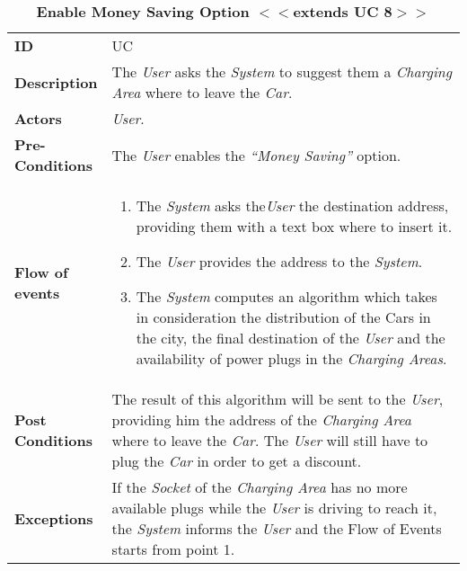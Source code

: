 \begin{longtable}{|p{0.2\linewidth} p{0.8\linewidth}|}
	\captionsetup{labelformat=empty} %
	\caption{\textbf{Enable Money Saving Option $<<$extends UC 8$>>$}} %
	\label{UC_PlugCar}%
	\\ \hline %
	
	\textbf{ID} & UC\theUseCaseIdCounter \\ \hline
	\textbf{Description} & The \emph{User} asks the \emph{System} to suggest them a \emph{Charging Area} where to leave the \emph{Car}. \\ \hline
	\textbf{Actors} & \emph{User}.\\ \hline
	\textbf{Pre-Conditions} & The \emph{User} enables the \textit{\textquotedblleft{Money Saving}\textquotedblright} option. \\ \hline
	\textbf{Flow of events} & 
	\begin{enumerate}
		\item The \emph{System} asks the\emph{User} the destination address, providing them with a text box where to insert it.
		\item The \emph{User} provides the address to the \emph{System}.
		\item The \emph{System} computes an algorithm which takes in consideration the distribution of the Cars in the city, the final destination of the \emph{User} and the availability of power plugs in the \emph{Charging Areas}.
	\end{enumerate}	 \\ \hline
	\textbf{Post Conditions} &  The result of this algorithm will be sent to the \emph{User}, providing him the address of the \emph{Charging Area} where to leave the \emph{Car}. The \emph{User} will still have to plug the \emph{Car} in order to get a discount.
	\\ \hline
	\textbf{Exceptions} & If the \emph{Socket} of the \emph{Charging Area} has no more available plugs while the \emph{User} is driving to reach it, the \emph{System} informs the \emph{User} and the Flow of Events starts from point 1.\\ \hline
\end{longtable}
